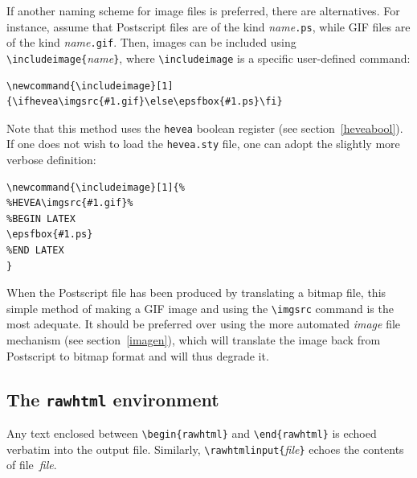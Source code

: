 If another naming scheme for image files is preferred, there are
alternatives.
For instance, assume that Postscript files are of the kind
\textit{name}\texttt{.ps}, while GIF files are of the kind
\textit{name}\texttt{.gif}.
Then, images can be included using
\verb+\includeimage{+\textit{name}\verb+}+, where
\verb+\includeimage+ is a specific user-defined command:
\begin{verbatim}
\newcommand{\includeimage}[1]{\ifhevea\imgsrc{#1.gif}\else\epsfbox{#1.ps}\fi}
\end{verbatim}
Note that this method uses the \texttt{hevea} boolean register (see
section~\ref{heveabool}).
If one does not wish to load the \texttt{hevea.sty} file,
one can adopt the slightly more verbose definition:
\begin{verbatim}
\newcommand{\includeimage}[1]{%
%HEVEA\imgsrc{#1.gif}%
%BEGIN LATEX
\epsfbox{#1.ps}
%END LATEX
}
\end{verbatim}
When the Postscript file has been produced by
translating a bitmap file, this simple method of making a GIF image and
using the \verb+\imgsrc+ command 
is the most adequate.
It should be preferred over using the more automated \textit{image} file
mechanism (see section~\ref{imagen}),
which will translate the image back from
Postscript to bitmap format and will thus degrade it.



\subsection{The \texttt{rawhtml}\label{rawhtml} environment}
Any text enclosed between \verb+\begin{rawhtml}+ and
\verb+\end{rawhtml}+ is echoed verbatim into the \html{} output file.
Similarly, \verb+\rawhtmlinput{+\textit{file}\verb+}+ echoes the
contents of file~\textit{file}.

